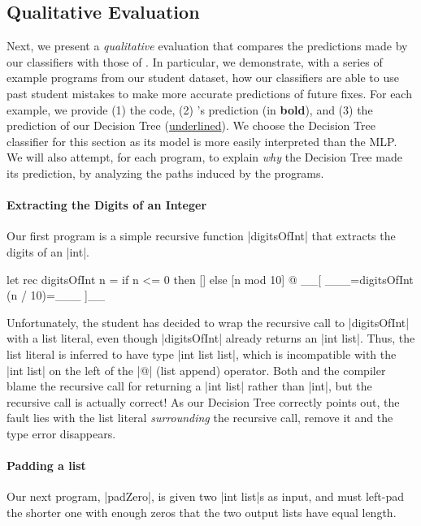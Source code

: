 \subsection{Qualitative Evaluation}
\label{sec:qualitative}

Next, we present a \emph{qualitative} evaluation that compares the
predictions made by our classifiers with those of \sherrloc.
%
In particular, we demonstrate, with a series of example programs from
our student dataset, how our classifiers are able to use past student
mistakes to make more accurate predictions of future fixes.
%
For each example, we provide
%
(1) the code,
%
(2) \sherrloc's prediction (in \textbf{bold}), and
%
(3) the prediction of our Decision Tree (\underline{underlined}).
%
We choose the Decision Tree classifier for this section as its model
is more easily interpreted than the MLP.
%
We will also attempt, for each program, to explain \emph{why} the
Decision Tree made its prediction, by analyzing the paths induced
by the programs.

\paragraph{Extracting the Digits of an Integer}
Our first program is a simple recursive function |digitsOfInt| that
extracts the digits of an |int|.
%
\begin{ecode}
  let rec digitsOfInt n =
    if n <= 0 then
      []
    else
      [n mod 10] @ __[ ___=digitsOfInt (n / 10)=___ ]__
\end{ecode}
%
Unfortunately, the student has decided to wrap the recursive call to
|digitsOfInt| with a list literal, even though |digitsOfInt| already
returns an |int list|.
%
Thus, the list literal is inferred to have type |int list list|, which
is incompatible with the |int list| on the left of the |@| (list append)
operator.
%
Both \sherrloc and the \ocaml compiler blame the recursive call for
returning a |int list| rather than |int|, but the recursive call is
actually correct!
%
As our Decision Tree correctly points out, the fault lies with the list
literal \emph{surrounding} the recursive call, remove it and the type
error disappears.
%

\paragraph{Padding a list}
Our next program, |padZero|, is given two |int list|s as input, and must
left-pad the shorter one with enough zeros that the two output lists
have equal length.

